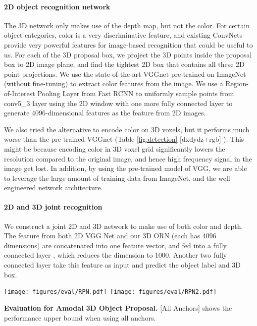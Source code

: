 \documentclass[10pt,twocolumn,letterpaper]{article}
\begin{document}
\vspace{-4mm}\paragraph{2D object recognition network}

The 3D network only makes use of the depth map, but not the color.
For certain object categories, color is a very discriminative feature,
and existing ConvNets provide very powerful features for image-based recognition that could be useful to us. For each of the 3D proposal box,
we project the 3D points inside the proposal box to 2D image plane, and find the tightest 2D box that contains all these 2D point projections.
We use the state-of-the-art VGGnet \cite{vggnet} pre-trained on ImageNet \cite{imagenet} (without fine-tuning) to extract color features from the image.
We use a Region-of-Interest Pooling Layer from Fast RCNN \cite{FastRCNN} to uniformly sample  points from conv5\_3 layer 
using the 2D window with one more fully connected layer to generate 4096-dimensional features as the feature from 2D images.

We also tried the alternative to encode color on 3D voxels, but it performs much worse than the pre-trained VGGnet (Table \ref{fig:detection} [dxdydz+rgb] ).
This might be because encoding color in 3D voxel grid significantly lowers the resolution compared to the original image, and hence high frequency signal in the image get lost. 
In addition, by using the pre-trained model of VGG, 
we are able to leverage the large amount of training data from ImageNet, and the well engineered network architecture.

\vspace{-4mm}\paragraph{2D and 3D joint recognition}
We construct a joint 2D and 3D network to make use of both color and depth.
The feature from both 2D VGG Net and our 3D ORN (each has 4096 dimensions) are concatenated into one feature vector, and fed into a fully connected layer 
, which reduces the dimension to 1000.
Another two fully connected layer take this feature as input and predict the object label and 3D box. 


\begin{table*}[t]
\vspace{-3mm}

\texttt{[image: figures/eval/RPN.pdf]}~\texttt{[image: figures/eval/RPN2.pdf]}

\vspace{-2mm}
\caption{{\bf Evaluation for Amodal 3D Object Proposal.} [All Anchors] shows the performance upper bound when using all anchors.}
\label{fig:RPNeval}
\vspace{-3mm}
\end{table*}
\end{document}
